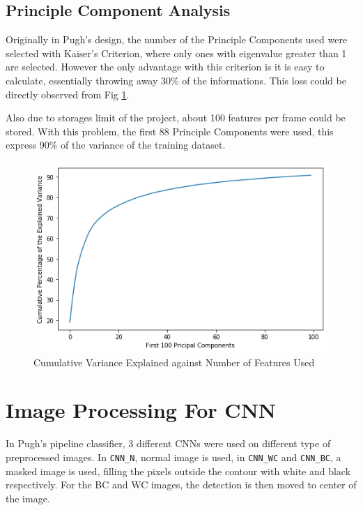 \documentclass[bsc,logo,twoside,fullspacing,parskip]{infthesis}
\begin{document}
\subsection{Principle Component Analysis}

Originally in Pugh's design, the number of the Principle Components used were selected with Kaiser's Criterion, where only ones with eigenvalue greater than 1 are selected. However the only advantage with this criterion is it is easy to calculate, essentially throwing away 30\% of the informations. This loss could be directly observed from Fig \ref{fig:pcsused}.

Also due to storages limit of the project, about 100 features per frame could be stored. With this problem, the first 88 Principle Components were used, this express 90\% of the variance of the training dataset.

\begin{figure}[ht]
\centering
    \includegraphics[scale=0.40]{graph/pcas.png}
    \caption{Cumulative Variance Explained against Number of Features Used}
    \label{fig:pcsused}
\end{figure}

\section{Image Processing For CNN}
\label{sec:CNNprepro}

In Pugh's pipeline classifier, 3 different CNNs were used on different type of preprocessed images.
In  {\tt CNN\_N}, normal image is used, in {\tt CNN\_WC} and {\tt CNN\_BC}, a masked image is used, filling the pixels outside the contour with white and black respectively.
For the BC and WC images, the detection is then moved to center of the image.
\end{document}
